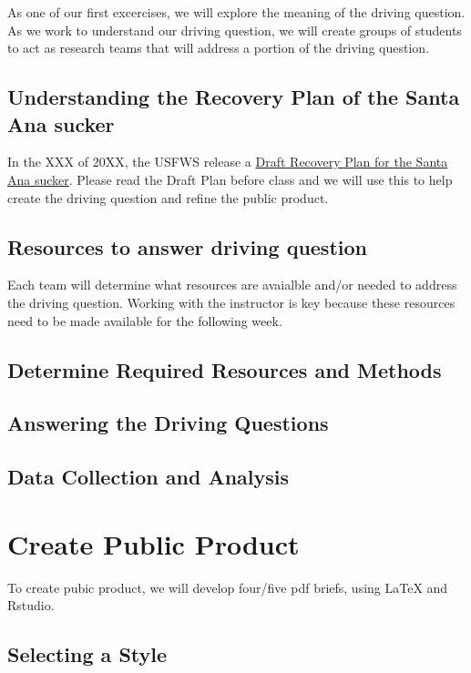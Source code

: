 \documentclass{article}\usepackage[]{graphicx}\usepackage[]{color}
\begin{document}
As one of our first excercises, we will explore the meaning of the driving question. As we work to understand our driving question, we will create groups of students to act as research teams that will address a portion of the driving question.

\subsection{Understanding the Recovery Plan of the Santa Ana sucker}

In the XXX of 20XX, the USFWS release a \href{https://www.fws.gov/carlsbad/SpeciesStatusList/RP/201411xx_Draft%20RP_SASU.pdf}{Draft Recovery Plan for the Santa Ana sucker}. Please read the Draft Plan before class and we will use this to help create the driving question and refine the public product. 

\subsection{Resources to answer driving question}



Each team will determine what resources are avaialble and/or needed to address the driving question. Working with the instructor is key because these resources need to be made available for the following week.

\subsection{Determine Required Resources and Methods}


\subsection{Answering the Driving Questions}

\subsection{Data Collection and Analysis}

\section{Create Public Product}

To create pubic product, we will develop four/five pdf briefs, using LaTeX and Rstudio. 

\subsection{Selecting a Style}
\end{document}
